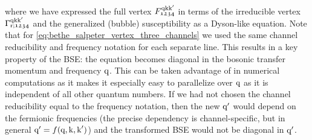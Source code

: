 \documentclass[\main/main.tex]{subfiles}
\begin{document}
where we have expressed the full vertex $F_{\mathfrak{1234}}^{\text{q}\text{k}\text{k}'}$ in terms of the irreducible vertex $\Gamma_{\text{r};\mathfrak{1234}}^{\text{q}\text{k}\text{k}'}$ and the generalized (bubble) susceptibility as a Dyson-like equation. Note that for \eqref{eq:bethe_salpeter_vertex_three_channels} we used the same channel reducibility and frequency notation for each separate line. This results in a key property of the BSE: the equation becomes diagonal in the bosonic transfer momentum and frequency $\text{q}$. This can be taken advantage of in numerical computations as it makes it especially easy to parallelize over $\text{q}$ as it is independent of all other quantum numbers. If we had not chosen the channel reducibility equal to the frequency notation, then the new $\text{q}'$ would depend on the fermionic frequencies (the precise dependency is channel-specific, but in general $\text{q}'=f(\text{q},\text{k},\text{k}')$) and the transformed BSE would not be diagonal in $\text{q}'$. 
\end{document}
